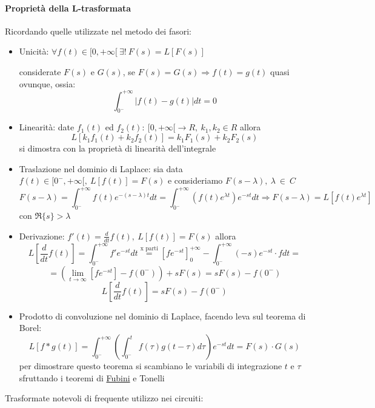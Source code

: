 \paragraph{Proprietà della L-trasformata} Ricordando quelle utilizzate nel metodo dei fasori:
\begin{itemize}
\item Unicità: $\forall f(t) \in [0,+\infty[\ \exists!\ F(s) = L[F(s)]$

considerate $F(s)$ e $G(s)$, se $F(s) = G(s) \Rightarrow f(t) = g(t)$ quasi ovunque, ossia:
$$\int_{0^-}^{+\infty}|f(t) - g(t)|dt = 0$$

\item Linearità: date $f_1(t)$ ed $f_2(t) :\ [0,+\infty[ \rightarrow R,\ k_1,k_2 \in R$ allora
$$L[k_1f_1(t) + k_2f_2(t)] = k_1F_1(s) + k_2F_2(s) $$
si dimostra con la proprietà di linearità dell'integrale

\item Traslazione nel dominio di Laplace: sia data $f(t) \in [0^-,+\infty[,\ L[f(t)] = F(s)$ e
consideriamo $F(s-\lambda),\ \lambda\ \in\ C$ 
$$F(s-\lambda) = \int_{0^-}^{+\infty}f(t) e^{-(s-\lambda)t}dt = \int_{0^-}^{+\infty} (f(t)e^{\lambda t})e^{-st} dt \Rightarrow F(s-\lambda) = L[f(t) e^{\lambda t}]$$ con $\Re\{s\} > \lambda$ 

\item Derivazione: $f'(t)  = \frac{d}{dt}f(t),\ L[f(t)] = F(s)$ allora 
$$L\left[\frac{d}{dt}f(t)\right] = \int_{0^-}^{+\infty}f'e^{-st}dt \stackrel{\text{x parti}}{=} 
\left[fe^{-st}\right]_0^{+\infty} - \int_{0^-}^{+\infty}(-s)e^{-st}\cdot f dt =$$
$$= \left(\lim_{t\to\infty}\left[fe^{-st}\right]-f(0^-)\right) + sF(s) = sF(s) - f(0^-)$$
$$
L\left[\frac{d}{dt}f(t)\right] = sF(s) - f(0^-)
$$
\item Prodotto di convoluzione nel dominio di Laplace, facendo leva sul teorema di Borel:
$$
L\left[f*g(t)\right] =\int_{0^-}^{+\infty}\left(\int_{0^-}^{t}f(\tau)g(t-\tau)d\tau\right) e^{-st}dt = F(s)\cdot G(s)
$$
per dimostrare questo teorema si scambiano le variabili di integrazione $t$ e $\tau$ sfruttando i teoremi
di \href{https://it.wikipedia.org/wiki/Teorema_di_Fubini}{Fubini} e Tonelli
\end{itemize}
\newpage
Trasformate notevoli di frequente utilizzo nei circuiti:
